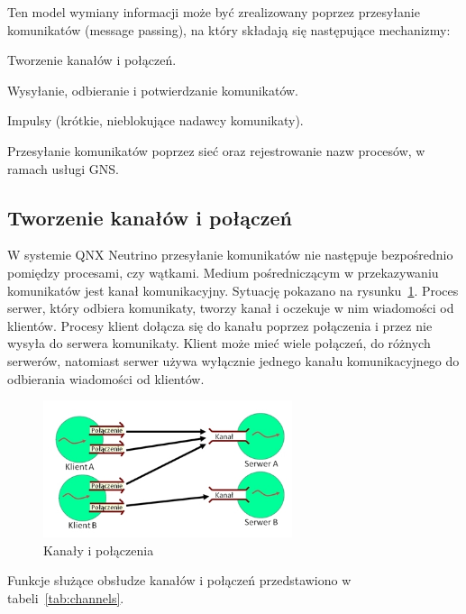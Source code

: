 Ten model wymiany informacji może być zrealizowany poprzez przesyłanie komunikatów (message passing), na który składają się następujące mechanizmy: 

\begin{myitemize}
\item Tworzenie kanałów i połączeń.
\item Wysyłanie, odbieranie i potwierdzanie komunikatów.
\item Impulsy (krótkie, nieblokujące nadawcy komunikaty).
\item Przesyłanie komunikatów poprzez sieć oraz rejestrowanie nazw procesów, w ramach usługi GNS. 
\end{myitemize} 


\subsection{Tworzenie kanałów i połączeń}

W systemie QNX Neutrino przesyłanie komunikatów nie następuje bezpośrednio pomiędzy procesami, czy wątkami. Medium pośredniczącym w przekazywaniu komunikatów jest kanał komunikacyjny. Sytuację pokazano na rysunku~\ref{fig:channels}. Proces serwer, który odbiera komunikaty, tworzy kanał i oczekuje w nim wiadomości od klientów. Procesy klient dołącza się do kanału poprzez połączenia i przez nie wysyła do serwera komunikaty. Klient może mieć wiele połączeń, do różnych serwerów, natomiast serwer używa wyłącznie jednego kanału komunikacyjnego do odbierania wiadomości od klientów. 


\begin{figure}[!h]
\centering
\includegraphics[width=0.65\textwidth]{img/channels}
\caption{Kanały i połączenia}
\label{fig:channels}
\end{figure}

Funkcje służące obsłudze kanałów i połączeń przedstawiono w tabeli~\ref{tab:channels}. 

